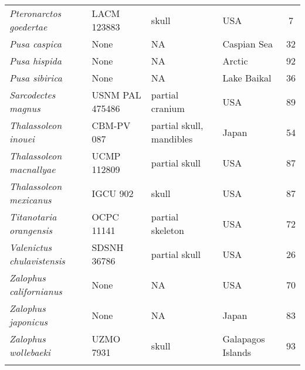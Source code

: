\begin{longtable}{p{}p{}p{}lc}
\textit{Pteronarctos goedertae} &	LACM 123883 & 	skull & 	USA	 & 7\\
\textit{Pusa caspica} &	None & 	NA & 	Caspian Sea & 32\\
\textit{Pusa hispida} &	None & 	NA & 	Arctic & 92\\
\textit{Pusa sibirica} &	None & 	NA & 	Lake Baikal & 36\\
\textit{Sarcodectes magnus} &	USNM PAL 475486 & 	partial cranium & 	USA & 89\\
\textit{Thalassoleon inouei} &	CBM-PV 087 & 	partial skull, mandibles & 	Japan & 54\\
\textit{Thalassoleon macnallyae} &	UCMP 112809 & 	partial skull & 	USA & 87\\
\textit{Thalassoleon mexicanus} &	IGCU 902 & 	skull & 	USA & 87\\
\textit{Titanotaria orangensis} &	OCPC 11141 & 	partial skeleton & 	USA & 72\\
\textit{Valenictus chulavistensis} &	SDSNH 36786 & 	partial skull & 	USA & 26\\
\textit{Zalophus californianus} &	None & 	NA & 	USA	 & 70\\
\textit{Zalophus japonicus} &	None & 	NA & 	Japan & 83\\
\textit{Zalophus wollebaeki} &	UZMO 7931 & skull & 	Galapagos Islands & 93\\
\hline

\label{table-taxa}
\end{longtable}